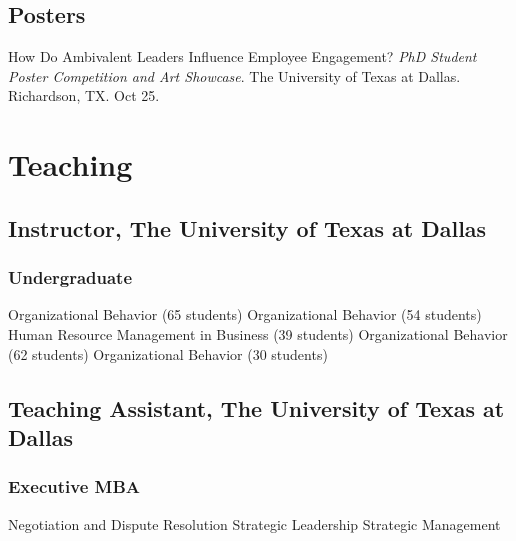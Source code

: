 \subsection*{Posters}

\begin{entries}
     How Do Ambivalent Leaders Influence Employee Engagement? \textit{PhD Student Poster Competition and Art Showcase}. The University of Texas at Dallas. Richardson, TX. Oct 25.

\end{entries}

\fi


\section*{Teaching}

\ifcvmedium
\subsection*{Instructor, The University of Texas at Dallas}

\subsubsection*{Undergraduate}

\begin{entries}[\cvdatewwide]
Organizational Behavior (65 students)
Organizational Behavior (54 students)
Human Resource Management in Business (39 students)
Organizational Behavior (62 students)
Organizational Behavior (30 students)
\end{entries}

\subsection*{Teaching Assistant, The University of Texas at Dallas}

\subsubsection*{Executive MBA}

\begin{entries}[\cvdatewwide]
Negotiation and Dispute Resolution
Strategic Leadership
Strategic Management
\end{entries}

